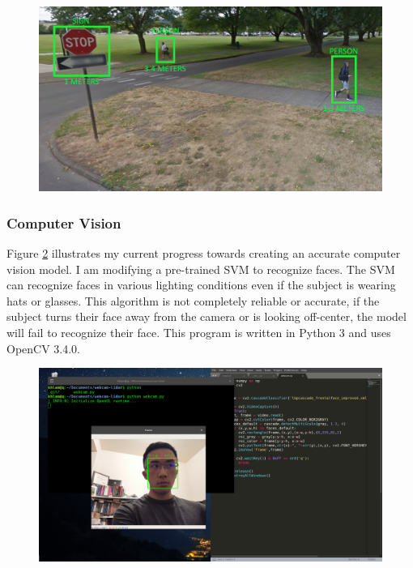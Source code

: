 \documentclass[onecolumn, draftclsnofoot,10pt, compsoc]{IEEEtran}
\begin{document}
\begin{singlespace}
			\begin{figure}[here]
				\includegraphics[scale=0.5, width=\textwidth]{overlay_design.png}
				\label{overlay}
			\end{figure}

		\subsubsection{Computer Vision}
			Figure \ref{svm} illustrates my current progress towards creating an accurate computer vision model.
			I am modifying a pre-trained SVM to recognize faces.
			The SVM can recognize faces in various lighting conditions even if the subject is wearing hats or glasses.
			This algorithm is not completely reliable or accurate, if the subject turns their face away from the camera or is looking off-center, the model will fail to recognize their face.
			This program is written in Python 3 and uses OpenCV 3.4.0. \cite{opencv}

			\begin{figure}[here]
				\includegraphics[scale=0.4, width=\textwidth]{lam_SVM_progess.png}
				\label{svm}
			\end{figure}


\end{singlespace}
\end{document}
